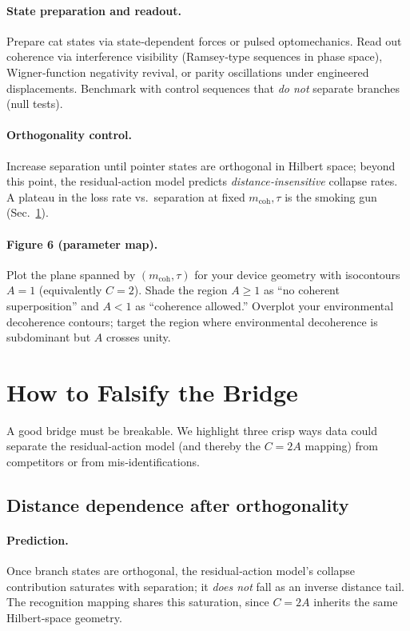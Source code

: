 \documentclass[11pt,letterpaper]{article}
\theoremstyle{definition}
\begin{document}
\paragraph{State preparation and readout.}
Prepare cat states via state‑dependent forces or pulsed optomechanics. Read out coherence via interference visibility (Ramsey‑type sequences in phase space), Wigner‑function negativity revival, or parity oscillations under engineered displacements. Benchmark with control sequences that \emph{do not} separate branches (null tests). %
\paragraph{Orthogonality control.}
Increase separation until pointer states are orthogonal in Hilbert space; beyond this point, the residual‑action model predicts \emph{distance‑insensitive} collapse rates. A plateau in the loss rate vs.\ separation at fixed $m_{\mathrm{coh}},\tau$ is the smoking gun (Sec.~\ref{sec:falsify}). %
\paragraph{Figure 6 (parameter map).}
Plot the plane spanned by $(m_{\mathrm{coh}},\tau)$ for your device geometry with isocontours $A=1$ (equivalently $C=2$). Shade the region $A\ge 1$ as ``no coherent superposition'' and $A<1$ as ``coherence allowed.'' Overplot your environmental decoherence contours; target the region where environmental decoherence is subdominant but $A$ crosses unity. %

\section{How to Falsify the Bridge}
\label{sec:falsify}

A good bridge must be breakable. We highlight three crisp ways data could separate the residual‑action model (and thereby the $C=2A$ mapping) from competitors or from mis‑identifications.

\subsection{Distance dependence after orthogonality}

\paragraph{Prediction.}
Once branch states are orthogonal, the residual‑action model’s collapse contribution saturates with separation; it \emph{does not} fall as an inverse distance tail. The recognition mapping shares this saturation, since $C=2A$ inherits the same Hilbert‑space geometry. %
\end{document}

